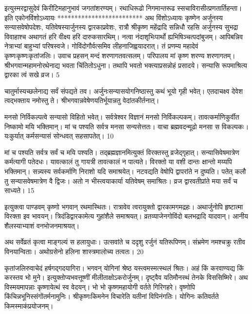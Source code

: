 इत्युस्मरद्वासुदेवं किरीटिमहानुभावं
जगतांशरण्यम्।
रथाधिरूढो निगमान्तरूढ
स्सचाविरासीत्प्रणतार्तिहन्ता।
इति एकोनविंशोऽध्यायः
*************************
अथ विंशोऽध्यायः कृष्णेन अर्जुनस्य सन्यासवेषोपदेशः, यतिवेषस्यार्जुनस्य द्वारकाप्रवेशः, रात्रौ श्रीकृष्ण महेंद्रादि सन्निधौ रहसि अर्जुनस्य सुभद्रा विवाहाश्च अथागतं हरि वीक्ष्य हरि दारुकसारथिम्।
नत्वा नंदाशृभिःपार्थो ह्यभिषिञ्चत्पदांबुजम्।
आपिबन्निव नेत्राभ्यां बाहुभ्यां परिषस्वजे।
गोविंदोगौर्वत्समिव लीहनाजिह्वयादरात्।
तं प्रणम्य महादेवं कृष्णःकृष्णःकृतांजलिः।
उवाच प्रहसन् मन्दं शरणागतवत्सलम्।
परिपालय मां कृष्ण शरण्य शरणागतम्।
श्रीभगवान्महामनोरथेनाद्य भवता चिंतितोऽधुना।
तथापि भवतो भक्त्याप्रसन्नोहं प्रसादये।
सन्यासि रूपमाश्रित्य द्वारका त्वं सखे व्रज।
5

चातुर्मास्यच्छलेनाद्य सर्वं संपद्यते तव।
अर्जुनःसन्यासयोगनिष्ठास्तु कथं भूयो गृही भवेत्।
एतदाचक्ष्व देवेश त्वद्भक्ताय नमोस्तु ते।
श्रीभगवान्नवेषेणयतिर्भूयान्नतु वेदांतकीर्तनात्।

मनसो निर्विकल्पत्वे सन्यासो विहितो भवेत्।
सर्वत्रेश्वर विज्ञानं मनसो निर्विकल्पकम्।
तावत्कर्माणिकुर्वीत निष्कामो मयि भक्तिमान्।
मां च पश्यति सर्वत्र मनसा सन्यसेत्ततः।
वाचा ब्रह्मवदन्मूढो मनसा स विकल्पकः।
यःकुर्यात् कर्मसन्यासं सोन्धवत् सहसापतेत्।
10

मां च पश्यति सर्वत्र सर्वं च मयि पश्यति।
तद्ब्रह्मज्ञानमित्युक्तं विरक्तस्तु व्रजेद्गृहात्।
सन्यासिवेषमात्रेण कर्मत्यागी पतेदधः।
यावत्कालं तु गायत्री तावत्कालं न पात्यते।
विरक्तो या वशी दान्तः क्षान्तो मय्यपि भक्तिमान्।
सन्न्यस्य सर्वकर्माणि निराशो यदि समाश्रयेत्।
नटवद्यति वेषोपि द्वापरांते न दुष्यति।
पतेत् कलौ तु सन्यासवेषमात्रेण वै द्विजः।
अतो न भीस्त्वयाकार्या यतिवेषम् समाश्रितः।
व्रज द्वारवतीप्रांते मया सर्वं च साध्यते।
15

इत्युक्त्वा पाण्डवम् कृष्णो भगवान् रथमास्थितः।
रात्रावेव त्वरायुक्तो द्वारकामगमद्रहः।
अथार्जुनोपि हृष्टात्मा विरक्ता इव भावयन्।
त्रिदंडिद्वारकामेत्य गुहांशैले समाश्रयत्।
व्रतव्याजेनगोविंदो बलभद्रादि यादवान्।
आनीय शैलस्याभ्याशं वनभोजनमाश्रयत्।

अथ सर्वेव्रतं कृत्वा माङ्गल्यं स हलायुधाः।
उत्सवांते च ददृशु रर्जुनं यतिरूपिणम्।
संभ्रमेण नमश्चक्रु रतीव विनयान्विताः।
अथोग्रसेनो हलिना शास्त्रमालोच्य तत्वतः।
20

कृतांजलिरुवाचेदं हर्षगद्गदयागिरा।
भगवन् योगिनां श्रेष्ठ यस्त्वमस्मत्स्थलं श्रितः।
अहं किं करवाण्यद्य किं करस्तव भो मुने।
इत्युक्तोप्यभवत्तूष्णीं मीलीताक्षोऽकरोर्जुनम्।
दृष्ट्वैव यतिमौनस्थं तेनके विससिष्मिरे।
अथ विस्मयमापन्नाः कृष्णायेत्थं स्व वेदयन्।
भो भो कृष्णमहायोगी वर्तते गिरिगहरे।
वृष्णोपि किंचिन्नभूनिस्संगोंतर्मनामुनिः।
श्रीकृष्णःकिमनेन विचारेति यतीनां विपिनंगतिः।
योगिनः कतिवर्तते किमस्माकंप्रयोजनम्।

